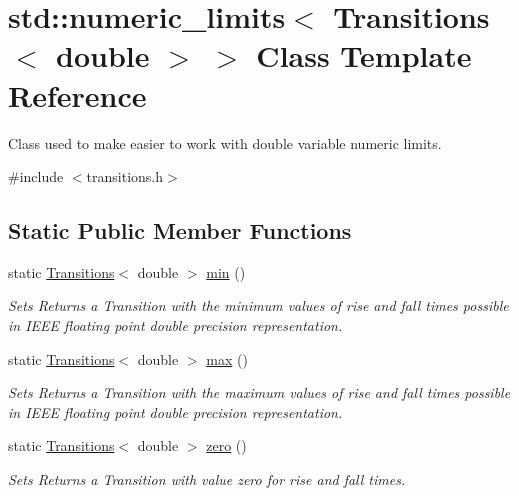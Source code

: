 \hypertarget{classstd_1_1numeric__limits_3_01Transitions_3_01double_01_4_01_4}{\section{std\-:\-:numeric\-\_\-limits$<$ Transitions$<$ double $>$ $>$ Class Template Reference}
\label{classstd_1_1numeric__limits_3_01Transitions_3_01double_01_4_01_4}
}


Class used to make easier to work with double variable numeric limits.  




{\ttfamily \#include $<$transitions.\-h$>$}

\subsection*{Static Public Member Functions}
\begin{DoxyCompactItemize}
\item 
static \hyperlink{classTransitions}{Transitions}$<$ double $>$ \hyperlink{classstd_1_1numeric__limits_3_01Transitions_3_01double_01_4_01_4_aaf2bf171cb5f11b864b09798f6d63460}{min} ()
\begin{DoxyCompactList}\small\item\em Sets Returns a Transition with the minimum values of rise and fall times possible in I\-E\-E\-E floating point double precision representation. \end{DoxyCompactList}\item 
static \hyperlink{classTransitions}{Transitions}$<$ double $>$ \hyperlink{classstd_1_1numeric__limits_3_01Transitions_3_01double_01_4_01_4_aac0b30f8990c636cda3f083b95e626a4}{max} ()
\begin{DoxyCompactList}\small\item\em Sets Returns a Transition with the maximum values of rise and fall times possible in I\-E\-E\-E floating point double precision representation. \end{DoxyCompactList}\item 
static \hyperlink{classTransitions}{Transitions}$<$ double $>$ \hyperlink{classstd_1_1numeric__limits_3_01Transitions_3_01double_01_4_01_4_ab17fbee311d6e67204ca678d02ba1e80}{zero} ()
\begin{DoxyCompactList}\small\item\em Sets Returns a Transition with value zero for rise and fall times. \end{DoxyCompactList}\end{DoxyCompactItemize}



